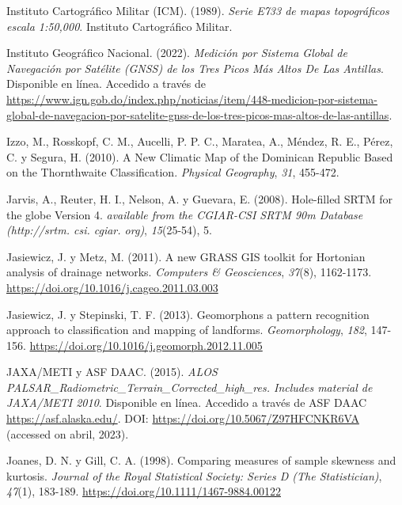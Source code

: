 \documentclass[spanish]{article}
\newlength{\cslhangindent}
\newlength{\cslentryspacingunit} %
\newenvironment{CSLReferences}[2] %
 {%
  \setlength{\parindent}{0pt}
  \ifodd #1
  \let\oldpar\par
  \def\par{\hangindent=\cslhangindent\oldpar}
  \fi
  \setlength{\parskip}{#2\cslentryspacingunit}
 }%
 {}
\begin{document}
\begin{CSLReferences}{1}{0}
\leavevmode{}%
Instituto Cartográfico Militar (ICM). (1989). \emph{{Serie E733 de mapas
topográficos escala 1:50,000}}. {Instituto Cartográfico Militar}.

\leavevmode{}%
Instituto Geográfico Nacional. (2022). \emph{Medición por Sistema Global
de Navegación por Satélite (GNSS) de los Tres Picos Más Altos De Las
Antillas}. Disponible en línea. Accedido a través de
\url{https://www.ign.gob.do/index.php/noticias/item/448-medicion-por-sistema-global-de-navegacion-por-satelite-gnss-de-los-tres-picos-mas-altos-de-las-antillas}.

\leavevmode{}%
Izzo, M., Rosskopf, C. M., Aucelli, P. P. C., Maratea, A., Méndez, R.
E., Pérez, C. y Segura, H. (2010). A New Climatic Map of the Dominican
Republic Based on the Thornthwaite Classification. \emph{Physical
Geography}, \emph{31}, 455-472.

\leavevmode{}%
Jarvis, A., Reuter, H. I., Nelson, A. y Guevara, E. (2008). Hole-filled
SRTM for the globe Version 4. \emph{available from the CGIAR-CSI SRTM
90m Database (http://srtm. csi. cgiar. org)}, \emph{15}(25-54), 5.

\leavevmode{}%
Jasiewicz, J. y Metz, M. (2011). A new GRASS GIS toolkit for Hortonian
analysis of drainage networks. \emph{Computers \& Geosciences},
\emph{37}(8), 1162-1173.
\url{https://doi.org/10.1016/j.cageo.2011.03.003}

\leavevmode{}%
Jasiewicz, J. y Stepinski, T. F. (2013). Geomorphons {\textemdash} a
pattern recognition approach to classification and mapping of landforms.
\emph{Geomorphology}, \emph{182}, 147-156.
\url{https://doi.org/10.1016/j.geomorph.2012.11.005}

\leavevmode{}%
JAXA/METI y ASF DAAC. (2015). \emph{{ALOS
PALSAR\_Radiometric\_Terrain\_Corrected\_high\_res. Includes material de
JAXA/METI 2010}}. Disponible en línea. Accedido a través de ASF DAAC
\url{https://asf.alaska.edu/}. DOI:
\url{https://doi.org/10.5067/Z97HFCNKR6VA} (accessed on abril, 2023).

\leavevmode{}%
Joanes, D. N. y Gill, C. A. (1998). Comparing measures of sample
skewness and kurtosis. \emph{Journal of the Royal Statistical Society:
Series D (The Statistician)}, \emph{47}(1), 183-189.
\url{https://doi.org/10.1111/1467-9884.00122}


\end{CSLReferences}
\end{document}
